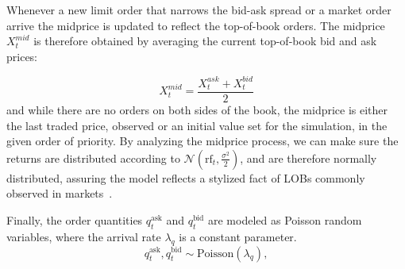 Whenever a new limit order that narrows the bid-ask spread or a market order arrive the midprice is updated to reflect the top-of-book orders.
The midprice $X_{t}^{mid}$ is therefore obtained by averaging the current top-of-book bid and ask prices:

\[
    X_{t}^{mid} = \frac{X_{t}^{ask} + X_{t}^{bid}}{2}
\]
and while there are no orders on both sides of the book, the midprice is either the last traded price,
observed or an initial value set for the simulation, in the given order of priority.
By analyzing the midprice process, we can make sure the returns are distributed according to $\mathcal{N}\left(\text{rf}_t, \frac{\sigma^2}{2}\right)$,
and are therefore normally distributed, assuring the model reflects a stylized fact of LOBs commonly observed in markets~\cite{Gueant2022}.

Finally, the order quantities $q_t^{\text{ask}}$ and $q_t^{\text{bid}}$ are modeled as Poisson random variables, where the arrival rate $\lambda_q$ is a constant parameter.
\[
    q_t^{\text{ask}}, q_t^{\text{bid}} \sim \text{Poisson}(\lambda_q),
\]
